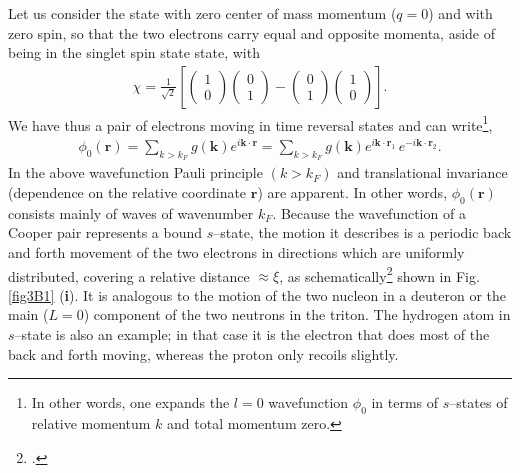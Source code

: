 Let us consider the state with zero center of mass momentum ($q=0$) and with zero spin, so that the two electrons carry  equal and opposite momenta, aside of being in the singlet spin state state, with
\begin{align}\label{eq3B2}
\chi=\frac{1}{\sqrt{2}}\left[
\left(\begin{array}{c}
1\\ 
0
\end{array} \right)
\left(\begin{array}{c}
0\\ 
1
\end{array} \right)-
\left(\begin{array}{c}
0\\ 
1
\end{array} \right)
\left(\begin{array}{c}
1\\ 
0
\end{array} \right)
\right].
\end{align}
 We have thus a pair of electrons moving in time reversal states and can write\footnote{In other words, one expands the $l=0$ wavefunction $\phi_0$ in terms of $s$--states of relative momentum $k$ and total momentum zero.},
\begin{align}\label{eq3B3}
\phi_0(\mathbf r)=\sum_{k>k_F}g(\mathbf k)e^{i\mathbf k\cdot\mathbf r}=\sum_{k>k_F}g(\mathbf k)e^{i\mathbf k\cdot\mathbf r_1}\,e^{-i\mathbf k\cdot\mathbf r_2}.
\end{align}
In the above wavefunction Pauli principle $(k>k_F)$ and translational invariance (dependence on the relative coordinate $\mathbf r$) are apparent. 
In other words, $\phi_0(\mathbf r)$ consists mainly of waves of wavenumber $k_F$. Because the wavefunction of a Cooper pair represents a bound $s$--state, the motion it describes is a periodic back and forth movement of the two electrons in  directions which are uniformly distributed, covering a relative distance $\approx\xi$, as schematically\footnote{\cite{Weisskopf:81}.} shown in Fig. \ref{fig3B1} (\textbf{i}). It is analogous to the motion of the two nucleon in a deuteron or the main ($L=0$) component of the two neutrons in the triton. The hydrogen atom in $s$--state is also an example; in that case it is the electron that does most of the back and forth moving, whereas the proton only recoils slightly.

